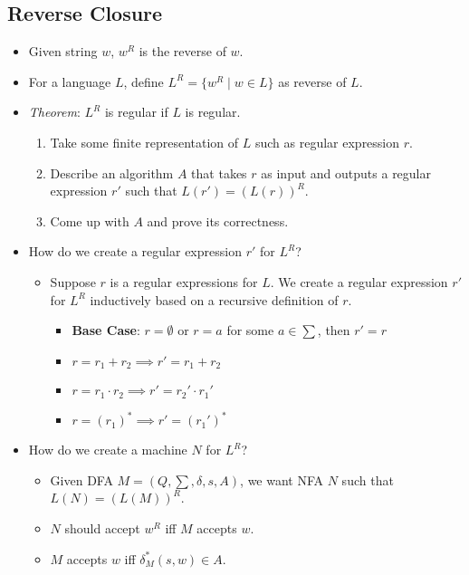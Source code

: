 \documentclass[12pt]{article}
\begin{document}
\subsection{Reverse Closure}
\begin{itemize}
    \item Given string $w$, $w^R$ is the reverse of $w$.
    \item For a language $L$, define $L^R = \{ w^R \mid w \in L \}$ as reverse of $L$.
    \item \textit{Theorem}: $L^R$ is regular if $L$ is regular.
    \begin{enumerate}
        \item Take some finite representation of $L$ such as regular expression $r$.
        \item Describe an algorithm $A$ that takes $r$ as input and outputs a regular expression $r'$ such that $L(r') = (L(r))^R$.
        \item Come up with $A$ and prove its correctness.
    \end{enumerate}
    \item How do we create a regular expression $r'$ for $L^R$?
    \begin{itemize}
        \item Suppose $r$ is a regular expressions for $L$. We create a regular expression $r'$ for $L^R$ inductively based on a recursive definition of $r$.
        \begin{itemize}
            \item \textbf{Base Case}: $r = \emptyset$ or $r = a$ for some $a \in \sum$, then $r' = r$
            \item $r = r_1 + r_2 \implies r' = r_1 + r_2$
            \item $r = r_1 \cdot r_2 \implies r' = r_2' \cdot r_1'$
            \item $r = (r_1)^{\ast} \implies r' = (r_1')^{\ast}$
        \end{itemize}
    \end{itemize}
    \item How do we create a machine $N$ for $L^R$?
    \begin{itemize}
        \item Given DFA $M = (Q, \sum, \delta, s, A)$, we want NFA $N$ such that $L(N) = (L(M))^R$.
        \item $N$ should accept $w^R$ iff $M$ accepts $w$.
        \item $M$ accepts $w$ iff $\delta_M^{\ast}(s,w) \in A$.
    \end{itemize}
\end{itemize}
\end{document}
